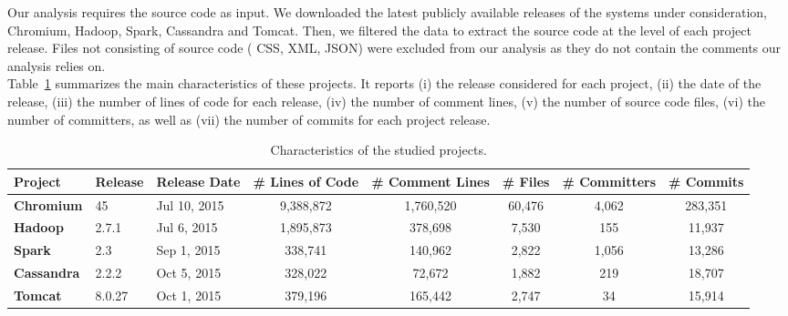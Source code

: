 Our analysis requires the source code as input. We downloaded the latest publicly available releases of the systems under consideration, \ie{} Chromium, Hadoop, Spark, Cassandra and Tomcat. Then, we filtered the data to extract the source code at the level of each project release. Files not consisting of source code (\eg{} CSS, XML, JSON) were excluded from our analysis as they do not contain the comments our analysis relies on.\\

Table~\ref{table:projects_statistics} summarizes the main characteristics of these projects. It reports (i) the release considered for each project, (ii) the date of the release, (iii) the number of lines of code for each release, (iv)  the number of comment lines, (v)  the number of source code files, (vi)  the number of committers, as well as (vii) the number of commits for each project release.

	
\begin{table}[t]


		\centering
		\caption{Characteristics of the studied projects.}
				\begin{adjustbox}{width=1.0\textwidth}
		\begin{tabular}{l|ll|ccccc}
			\hline
			\textbf{Project}  & \textbf{Release} & \textbf{ Release Date}  & \textbf{\# Lines of Code} & \textbf{\# Comment Lines} & \textbf{\# Files} & \textbf{\# Committers} & \textbf{\# Commits} \\ \hline
			\textbf{Chromium} &   45    & Jul 10, 2015 &  9,388,872   &    1,760,520    & 60,476 &    4,062    & 283,351  \\ \hline
			\textbf{Hadoop} &   2.7.1    & Jul 6, 2015 &  1,895,873   &    378,698    & 7,530 &    155    & 11,937  \\ \hline
			\textbf{Spark} &   2.3    & Sep 1, 2015 &  338,741   &    140,962    & 2,822 &    1,056    & 13,286  \\ \hline
			\textbf{Cassandra} &   2.2.2    & Oct 5, 2015 &  328,022   &    72,672    & 1,882 &    219    & 18,707  \\ \hline
			\textbf{Tomcat} &   8.0.27    & Oct 1, 2015 &  379,196   &    165,442    & 2,747 &    34    & 15,914  \\ \hline
		\end{tabular}
		\label{table:projects_statistics}
	\end{adjustbox}
\end{table}

